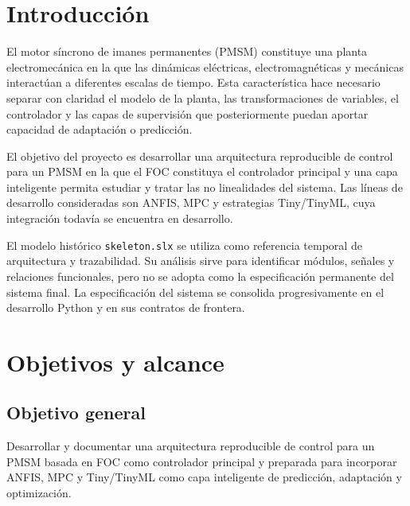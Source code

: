 \section{Introducción}

El motor síncrono de imanes permanentes (PMSM) constituye una planta electromecánica en la que las dinámicas eléctricas, electromagnéticas y mecánicas interactúan a diferentes escalas de tiempo. Esta característica hace necesario separar con claridad el modelo de la planta, las transformaciones de variables, el controlador y las capas de supervisión que posteriormente puedan aportar capacidad de adaptación o predicción.

El objetivo del proyecto es desarrollar una arquitectura reproducible de control para un PMSM en la que el FOC constituya el controlador principal y una capa inteligente permita estudiar y tratar las no linealidades del sistema. Las líneas de desarrollo consideradas son ANFIS, MPC y estrategias Tiny/TinyML, cuya integración todavía se encuentra en desarrollo.

El modelo histórico \texttt{skeleton.slx} se utiliza como referencia temporal de arquitectura y trazabilidad. Su análisis sirve para identificar módulos, señales y relaciones funcionales, pero no se adopta como la especificación permanente del sistema final. La especificación del sistema se consolida progresivamente en el desarrollo Python y en sus contratos de frontera.

\section{Objetivos y alcance}

\subsection{Objetivo general}
Desarrollar y documentar una arquitectura reproducible de control para un PMSM basada en FOC como controlador principal y preparada para incorporar ANFIS, MPC y Tiny/TinyML como capa inteligente de predicción, adaptación y optimización.

